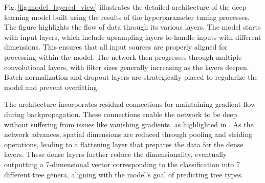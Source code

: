 Fig.\,\ref{fig:model_layered_view} illustrates the detailed architecture of the deep learning model built using the results of the hyperparameter tuning processes. The figure highlights the flow of data through its various layers. The model starts with input layers, which include upsampling layers to handle inputs with different dimensions. This ensures that all input sources are properly aligned for processing within the model. The network then progresses through multiple convolutional layers, with filter sizes generally increasing as the layers deepen. Batch normalization and dropout layers are strategically placed to regularize the model and prevent overfitting.

The architecture incorporates residual connections for maintaining gradient flow during backpropagation. These connections enable the network to be deep without suffering from issues like vanishing gradients, as highlighted in \cite{resnet}. As the network advances, spatial dimensions are reduced through pooling and striding operations, leading to a flattening layer that prepares the data for the dense layers. These dense layers further reduce the dimensionality, eventually outputting a 7-dimensional vector corresponding to the classification into 7 different tree genera, aligning with the model's goal of predicting tree types.



